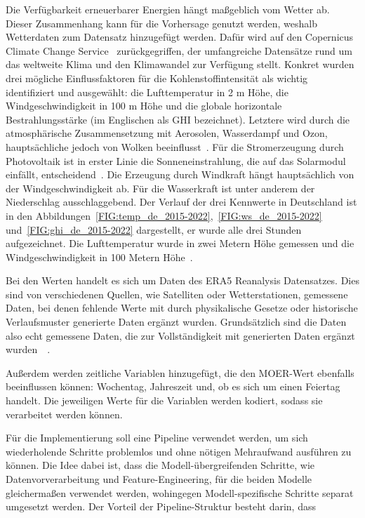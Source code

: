 Die Verfügbarkeit erneuerbarer Energien hängt maßgeblich vom Wetter ab.
Dieser Zusammenhang kann für die Vorhersage genutzt werden, weshalb Wetterdaten zum Datensatz hinzugefügt werden.
Dafür wird auf den Copernicus Climate Change Service~\cite{Copernicus.20231212T14:09:40.000Z} zurückgegriffen, der umfangreiche Datensätze rund um das weltweite Klima und den Klimawandel zur Verfügung stellt.
Konkret wurden drei mögliche Einflussfaktoren für die Kohlenstoffintensität als wichtig identifiziert und ausgewählt: die Lufttemperatur in 2 m Höhe, die Windgeschwindigkeit in 100 m Höhe und die globale horizontale Bestrahlungsstärke (im Englischen als \ac{GHI} bezeichnet).
Letztere wird durch die atmosphärische Zusammensetzung mit Aerosolen, Wasserdampf und Ozon, hauptsächliche jedoch von Wolken beeinflusst~\cite{KallioMyers.2020}.
Für die Stromerzeugung durch Photovoltaik ist in erster Linie die Sonneneinstrahlung, die auf das Solarmodul einfällt, entscheidend~\cite{James.}.
Die Erzeugung durch Windkraft hängt hauptsächlich von der Windgeschwindigkeit ab.
Für die Wasserkraft ist unter anderem der Niederschlag ausschlaggebend.
Der Verlauf der drei Kennwerte in Deutschland ist in den Abbildungen~\ref{FIG:temp_de_2015-2022},~\ref{FIG:ws_de_2015-2022} und~\ref{FIG:ghi_de_2015-2022} dargestellt, er wurde alle drei Stunden aufgezeichnet.
Die Lufttemperatur wurde in zwei Metern Höhe gemessen und die Windgeschwindigkeit in 100 Metern Höhe~\cite{Copernicus.20231212T14:09:40.000Z}.

Bei den Werten handelt es sich um Daten des ERA5 Reanalysis Datensatzes.
Dies sind von verschiedenen Quellen, wie Satelliten oder Wetterstationen, gemessene Daten, bei denen fehlende Werte mit durch physikalische Gesetze oder historische Verlaufsmuster generierte Daten ergänzt wurden.
Grundsätzlich sind die Daten also echt gemessene Daten, die zur Vollständigkeit mit generierten Daten ergänzt wurden~\cite{CopernicusClimateChangeService.2020}~\cite{CopernicusKnowledgeBase.20231009}.

Außerdem werden zeitliche Variablen hinzugefügt, die den MOER-Wert ebenfalls beeinflussen können: Wochentag, Jahreszeit und, ob es sich um einen Feiertag handelt.
Die jeweiligen Werte für die Variablen werden kodiert, sodass sie verarbeitet werden können.


Für die Implementierung soll eine Pipeline verwendet werden, um sich wiederholende Schritte problemlos und ohne nötigen Mehraufwand ausführen zu können.
Die Idee dabei ist, dass die Modell-übergreifenden Schritte, wie Datenvorverarbeitung und Feature-Engineering, für die beiden Modelle gleichermaßen verwendet werden, wohingegen Modell-spezifische Schritte separat umgesetzt werden.
Der Vorteil der Pipeline-Struktur besteht darin, dass

